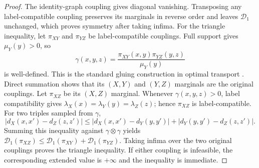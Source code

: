 \begin{proof}
The identity-graph coupling gives diagonal vanishing. Transposing any
label-compatible coupling preserves its marginals in reverse order and leaves
$\mathcal D_1$ unchanged, which proves symmetry after taking infima. For the
triangle inequality, let $\pi_{XY}$ and $\pi_{YZ}$ be label-compatible
couplings. Full support
gives $\mu_Y(y)>0$, so
\[
 \gamma(x,y,z)=\frac{\pi_{XY}(x,y)\pi_{YZ}(y,z)}{\mu_Y(y)}
\]
is well-defined. This is the standard gluing construction in optimal transport
\cite{villani2009optimal,peyre2019computational}. Direct summation shows that its $(X,Y)$ and
$(Y,Z)$ marginals are the original couplings. Let $\pi_{XZ}$ be its $(X,Z)$
marginal.
Whenever $\gamma(x,y,z)>0$, label compatibility gives
$\lambda_X(x)=\lambda_Y(y)=\lambda_Z(z)$; hence $\pi_{XZ}$ is
label-compatible. For two triples sampled from $\gamma$,
\[
 |d_X(x,x')-d_Z(z,z')|
 \leq |d_X(x,x')-d_Y(y,y')|+|d_Y(y,y')-d_Z(z,z')|.
\]
Summing this inequality against $\gamma\otimes\gamma$ yields
$\mathcal D_1(\pi_{XZ})\leq\mathcal D_1(\pi_{XY})+
\mathcal D_1(\pi_{YZ})$. Taking infima over the two original couplings proves
the triangle inequality. If either coupling is infeasible, the corresponding
extended value is $+\infty$ and the inequality is immediate.
\end{proof}
